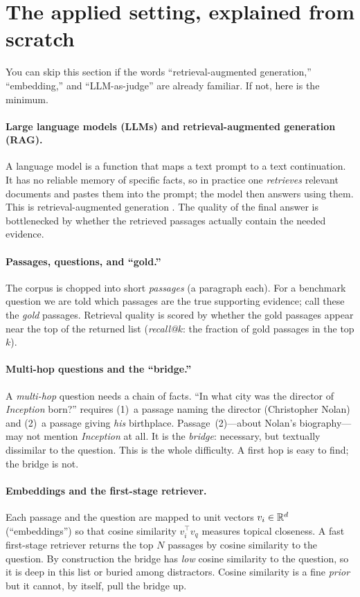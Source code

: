 \documentclass[11pt]{article}
\theoremstyle{plain}
\theoremstyle{definition}
\theoremstyle{remark}
\begin{document}
\section{The applied setting, explained from scratch}\label{sec:setting}
You can skip this section if the words ``retrieval-augmented generation,'' ``embedding,'' and ``LLM-as-judge'' are
already familiar. If not, here is the minimum.

\paragraph{Large language models (LLMs) and retrieval-augmented generation (RAG).} A language model is a function
that maps a text prompt to a text continuation. It has no reliable memory of specific facts, so in practice one
\emph{retrieves} relevant documents and pastes them into the prompt; the model then answers using them. This is
retrieval-augmented generation \citep{lewis2020rag}. The quality of the final answer is bottlenecked by whether the
retrieved passages actually contain the needed evidence.

\paragraph{Passages, questions, and ``gold.''} The corpus is chopped into short \emph{passages} (a paragraph each).
For a benchmark question we are told which passages are the true supporting evidence; call these the \emph{gold}
passages. Retrieval quality is scored by whether the gold passages appear near the top of the returned list
(\emph{recall@$k$}: the fraction of gold passages in the top $k$).

\paragraph{Multi-hop questions and the ``bridge.''} A \emph{multi-hop} question needs a chain of facts. ``In what
city was the director of \emph{Inception} born?'' requires (1)~a passage naming the director (Christopher Nolan) and
(2)~a passage giving \emph{his} birthplace. Passage~(2)---about Nolan's biography---may not mention \emph{Inception}
at all. It is the \emph{bridge}: necessary, but textually dissimilar to the question. This is the whole difficulty.
A first hop is easy to find; the bridge is not.

\paragraph{Embeddings and the first-stage retriever.} Each passage and the question are mapped to unit vectors
$v_i\in\mathbb{R}^d$ (``embeddings'') so that cosine similarity $v_i^\top v_q$ measures topical closeness. A fast
first-stage retriever returns the top $N$ passages by cosine similarity to the question. By construction the bridge
has \emph{low} cosine similarity to the question, so it is deep in this list or buried among distractors. Cosine
similarity is a fine \emph{prior} but it cannot, by itself, pull the bridge up.
\end{document}
